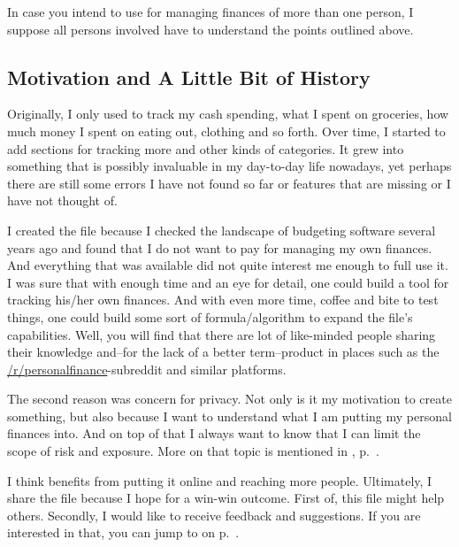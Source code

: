 In case you intend to use \tfn for managing finances of more than one person, I suppose all persons involved have to understand the points outlined above.

\subsection{Motivation and A Little Bit of History}
\label{subsec:motivation-history}

Originally, I only used \tfn to track my cash spending, \ie what I spent on groceries, how much money I spent on eating out, clothing and so forth.
Over time, I started to add sections for tracking more and other kinds of categories.
It grew into something that is possibly invaluable in my day-to-day life nowadays, yet perhaps there are still some errors I have not found so far or features that are missing or I have not thought of.

I created the file because I checked the landscape of budgeting software several years ago and found that I do not want to pay for managing my own finances.
And everything that was available did not quite interest me enough to full use it.
I was sure that with enough time and an eye for detail, one could build a tool for tracking his/her own finances.
And with even more time, coffee and bite to test things, one could build some sort of formula/algorithm to expand the file's capabilities.
Well, you will find that there are lot of like-minded people sharing their knowledge and--for the lack of a better term--product in places such as the \href{https://reddit.com/r/personalfinance}{/r/personalfinance}-subreddit and similar platforms.

The second reason was concern for privacy.
Not only is it my motivation to create something, but also because I want to understand what I am putting my personal finances into.
And on top of that I always want to know that I can limit the scope of risk and exposure.
More on that topic is mentioned in , p.~\pageref{subsubsec:security}.

I think \tfn benefits from putting it online and reaching more people.
Ultimately, I share the file because I hope for a win-win outcome.
First of, this file might help others.
Secondly, I would like to receive feedback and suggestions.
If you  are interested in that, you can jump to  on p.~\pageref{sec:feedback}.


